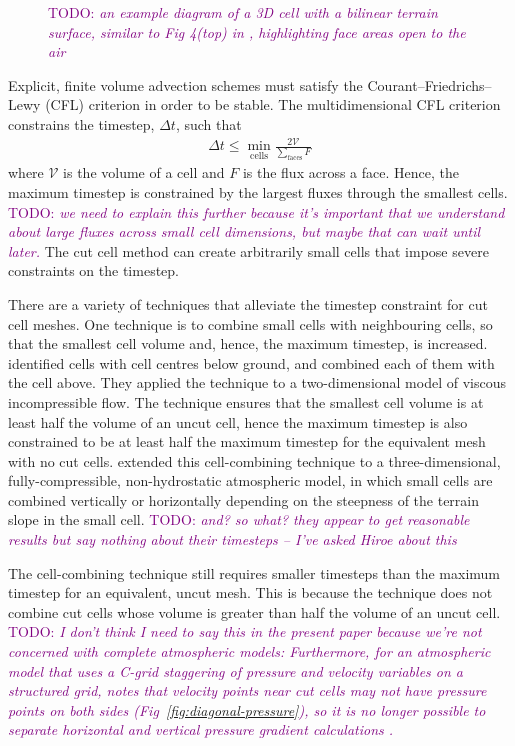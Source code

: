 \documentclass{article}
\newcommand{\TODO}[1]{\textcolor{purple}{TODO: \emph{#1}}}
\begin{document}
\begin{figure}
	\caption{\TODO{an example diagram of a 3D cell with a bilinear terrain surface, similar to Fig 4(top) in \cite{walko-avissar2008b}, highlighting face areas open to the air}}
	\label{fig:cut-cell}
\end{figure}

Explicit, finite volume advection schemes must satisfy the Courant--Friedrichs--Lewy (CFL) criterion in order to be stable.  The multidimensional CFL criterion constrains the timestep, $\Delta t$, such that
\begin{align}
	\Delta t \leq \min_\mathrm{cells} \frac{2\mathcal{V}}{\sum_\mathrm{faces} F}
\end{align}
where $\mathcal{V}$ is the volume of a cell and $F$ is the flux across a face.  Hence, the maximum timestep is constrained by the largest fluxes through the smallest cells.  \TODO{we need to explain this further because it's important that we understand about large fluxes across small cell dimensions, but maybe that can wait until later.}
The cut cell method can create arbitrarily small cells that impose severe constraints on the timestep.

There are a variety of techniques that alleviate the timestep constraint for cut cell meshes.  One technique is to combine small cells with neighbouring cells, so that the smallest cell volume and, hence, the maximum timestep, is increased.  \citet{ye1999} identified cells with cell centres below ground, and combined each of them with the cell above.  They applied the technique to a two-dimensional model of viscous incompressible flow.  The technique ensures that the smallest cell volume is at least half the volume of an uncut cell, hence the maximum timestep is also constrained to be at least half the maximum timestep for the equivalent mesh with no cut cells.
\citet{yamazaki2016} extended this cell-combining technique to a three-dimensional, fully-compressible, non-hydrostatic atmospheric model, in which small cells are combined vertically or horizontally depending on the steepness of the terrain slope in the small cell.  \TODO{and? so what? they appear to get reasonable results but say nothing about their timesteps -- I've asked Hiroe about this}

The cell-combining technique still requires smaller timesteps than the maximum timestep for an equivalent, uncut mesh.  This is because the technique does not combine cut cells whose volume is greater than half the volume of an uncut cell.
\TODO{I don't think I need to say this in the present paper because we're not concerned with complete atmospheric models: Furthermore, for an atmospheric model that uses a C-grid staggering of pressure and velocity variables on a structured grid, \citet{kirkpatrick2003} notes that velocity points near cut cells may not have pressure points on both sides (Fig~\ref{fig:diagonal-pressure}), so it is no longer possible to separate horizontal and vertical pressure gradient calculations \citep{walko-avissar2008b}.}
\end{document}
